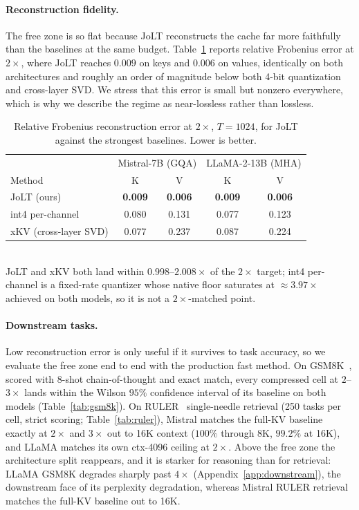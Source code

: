 \documentclass{article}
\begin{document}
\paragraph{Reconstruction fidelity.} The free zone is so flat because JoLT reconstructs the cache far more faithfully than the baselines at the same budget. Table~\ref{tab:recon} reports relative Frobenius error at $2\times$, where JoLT reaches $0.009$ on keys and $0.006$ on values, identically on both architectures and roughly an order of magnitude below both 4-bit quantization and cross-layer SVD. We stress that this error is small but nonzero everywhere, which is why we describe the regime as near-lossless rather than lossless.

\begin{table}[t]
  \centering
  \caption{Relative Frobenius reconstruction error at $2\times$, $T{=}1024$, for JoLT against the strongest baselines. Lower is better.}
  \label{tab:recon}
  \begin{tabular}{lcccc}
    \toprule
    & \multicolumn{2}{c}{Mistral-7B (GQA)} & \multicolumn{2}{c}{LLaMA-2-13B (MHA)} \\
    Method & K & V & K & V \\
    \midrule
    JoLT (ours) & \textbf{0.009} & \textbf{0.006} & \textbf{0.009} & \textbf{0.006} \\
    int4 per-channel & 0.080 & 0.131 & 0.077 & 0.123 \\
    xKV (cross-layer SVD) & 0.077 & 0.237 & 0.087 & 0.224 \\
    \bottomrule
  \end{tabular}
  \\[4pt]
  \footnotesize JoLT and xKV both land within $0.998$--$2.008\times$ of the $2\times$ target; int4 per-channel is a fixed-rate quantizer whose native floor saturates at $\approx 3.97\times$ achieved on both models, so it is not a $2\times$-matched point.
\end{table}

\paragraph{Downstream tasks.} Low reconstruction error is only useful if it survives to task accuracy, so we evaluate the free zone end to end with the production fast method. On GSM8K~\citep{cobbe2021gsm8k,wei2022cot}, scored with 8-shot chain-of-thought and exact match, every compressed cell at $2$--$3\times$ lands within the Wilson $95\%$ confidence interval of its baseline on both models (Table~\ref{tab:gsm8k}). On RULER~\citep{hsieh2024ruler} single-needle retrieval (250 tasks per cell, strict scoring; Table~\ref{tab:ruler}), Mistral matches the full-KV baseline exactly at $2\times$ and $3\times$ out to 16K context ($100\%$ through 8K, $99.2\%$ at 16K), and LLaMA matches its own ctx-4096 ceiling at $2\times$. Above the free zone the architecture split reappears, and it is starker for reasoning than for retrieval: LLaMA GSM8K degrades sharply past $4\times$ (Appendix~\ref{app:downstream}), the downstream face of its perplexity degradation, whereas Mistral RULER retrieval matches the full-KV baseline out to 16K.
\end{document}
